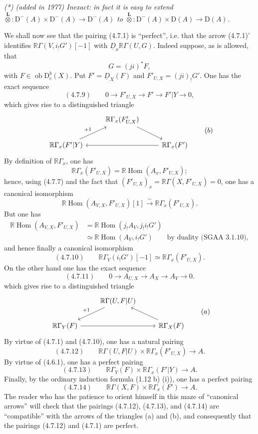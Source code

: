 \documentclass[11pt]{article}
\DeclareMathOperator{\Hom}{Hom}
\newcommand{\D}{\mathrm{D}}
\newcommand{\ob}{\operatorname{ob}}
\providecommand{\Hom}{\operatorname{Hom}}
\providecommand{\ob}{\operatorname{ob}}
\providecommand{\Hom}{\operatorname{Hom}}
\begin{document}
\emph{(*) (added in 1977) Inexact: in fact it is easy to extend $\overset{\mathbf L}{\otimes}:\D^-(A)\times\D^-(A)\to\D^-(A)$ to $\overset{\mathbf L}{\otimes}:\D^-(A)\times\D(A)\to\D(A)$.}

We shall now see that the pairing (4.7.1) is ``perfect'', i.e. that the arrow (4.7.1)' identifies $\mathbb{R}\Gamma(V,i_!G')[-1]$ with $\underline{D}_x\mathbb{R}\Gamma(U,G)$. Indeed suppose, as is allowed, that
\[
G=(ji)^*F,
\]
with $F\in\ob\D_c^b(X)$. Put $F'=\underline{D}_X(F)$ and $F'_{U,X}=(ji)_!G'$. One has the exact sequence
\[
(4.7.9)\qquad 0\longrightarrow F'_{U,X}\longrightarrow F'\longrightarrow F'|Y\longrightarrow0,
\]
which gives rise to a distinguished triangle
\[
\begin{tikzcd}
& \mathbb{R}\Gamma_x(F'_{U,X}) \arrow[dr] \\
\mathbb{R}\Gamma_x(F'|Y) \arrow[ur,"{+1}"] && \mathbb{R}\Gamma_x(F') \arrow[ll]
\end{tikzcd}
\qquad (b)
\]
By definition of $\mathbb{R}\Gamma_x$, one has
\[
\mathbb{R}\Gamma_x(F'_{U,X})=\mathbb{R}\Hom(A_x,F'_{U,X});
\]
hence, using (4.7.7) and the fact that $(F'_{U,X})_x=\mathbb{R}\Gamma(X,F'_{U,X})=0$, one has a canonical isomorphism
\[
\mathbb{R}\Hom(A_{V,X},F'_{U,X})[1]\xrightarrow{\sim}\mathbb{R}\Gamma_x(F'_{U,X}).
\]
But one has
\[
\begin{aligned}
\mathbb{R}\Hom(A_{V,X},F'_{U,X})&=\mathbb{R}\Hom(j_!A_V,j_!i_!G')\\
&\simeq\mathbb{R}\Hom(A_V,i_!G')\qquad\text{by duality (SGAA~3.1.10)},
\end{aligned}
\]
and hence finally a canonical isomorphism
\[
(4.7.10)\qquad \mathbb{R}\Gamma_V(i_!G')[-1]\simeq\mathbb{R}\Gamma_x(F'_{U,X}).
\]
On the other hand one has the exact sequence
\[
(4.7.11)\qquad 0\longrightarrow A_{U,X}\longrightarrow A_X\longrightarrow A_Y\longrightarrow0.
\]
which gives rise to a distinguished triangle
\[
\begin{tikzcd}
& \mathbb{R}\Gamma(U,F|U) \arrow[dl,"{+1}"'] \\
\mathbb{R}\Gamma_Y(F) \arrow[rr] && \mathbb{R}\Gamma_X(F) \arrow[ul]
\end{tikzcd}
\qquad (a)
\]
By virtue of (4.7.1) and (4.7.10), one has a natural pairing
\[
(4.7.12)\qquad \mathbb{R}\Gamma(U,F|U)\times\mathbb{R}\Gamma_x(F'_{U,X})\longrightarrow A.
\]
By virtue of (4.6.1), one has a perfect pairing
\[
(4.7.13)\qquad \mathbb{R}\Gamma_Y(F)\times\mathbb{R}\Gamma_x(F'|Y)\longrightarrow A.
\]
Finally, by the ordinary induction formula (1.12 b) (i)), one has a perfect pairing
\[
(4.7.14)\qquad \mathbb{R}\Gamma(X,F)\times\mathbb{R}\Gamma_x(F')\longrightarrow A.
\]
The reader who has the patience to orient himself in this maze of ``canonical arrows'' will check that the pairings (4.7.12), (4.7.13), and (4.7.14) are ``compatible'' with the arrows of the triangles (a) and (b), and consequently that the pairings (4.7.12) and (4.7.1) are perfect.
\end{document}
